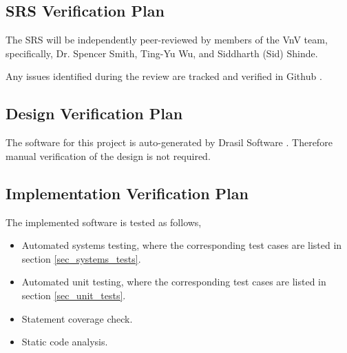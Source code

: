 \documentclass[12pt, titlepage]{article}
\begin{document}
\subsection{SRS Verification Plan}

  
The SRS will be independently peer-reviewed by members of the VnV team, specifically,
Dr. Spencer Smith, Ting-Yu Wu, and Siddharth (Sid) Shinde.
 
Any issues identified during the review are tracked and verified in Github \cite{Github}.
 
\subsection{Design Verification Plan}


The software for this project is auto-generated by Drasil Software \cite{Drasil}. Therefore
manual verification of the design is not required.

\subsection{Implementation Verification Plan}

  
The implemented software is tested as follows,

\begin{itemize}
\item Automated systems testing, where the corresponding test cases
are listed in section \ref{sec_systems_tests}. 
\item Automated unit testing, where the corresponding test cases are
listed in section \ref{sec_unit_tests}. 
\item Statement coverage check. 
\item Static code analysis.
\end{itemize}

\end{document}
